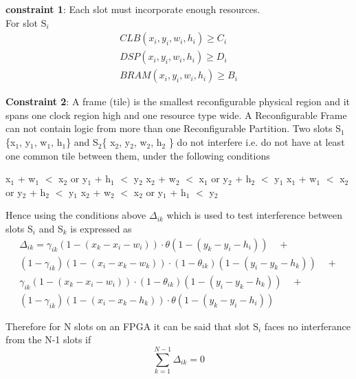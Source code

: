 \documentclass[11pt]{article}
\theoremstyle{definition}
\begin{document}
\textbf{constraint 1}: Each slot must incorporate enough resources. \\
For slot S$_i$
\begin{equation}
\begin{split}
CLB(x_{i}, y_{i}, w_{i}, h_{i}) \geq  C_{i}\\
DSP(x_{i}, y_{i}, w_{i}, h_{i}) \geq  D_{i} \\	
BRAM(x_{i}, y_{i}, w_{i}, h_{i}) \geq  B_{i}
\end{split}
\end{equation}

\textbf{Constraint 2}: A frame (tile) is the smallest reconfigurable physical region and it spans one clock region high and one resource type wide. A Reconfigurable Frame can not contain logic from more than one Reconfigurable Partition. Two slots S$_1$ \{x$_1$, y$_1$, w$_1$, h$_1$\} and S$_2$\{ x$_2$, y$_2$, w$_2$, h$_2$ \} do not interfere i.e. do not have at least one common tile between them, under the following conditions \\

\begin{algorithmic}
	\STATE x$_1$ + w$_1$ $<$ x$_2$ or y$_1$ + h$_1$ $<$ y$_2$
	\STATE x$_2$ + w$_2$ $<$ x$_1$ or y$_2$ + h$_2$ $<$ y$_1$
	\STATE x$_1$ + w$_1$ $<$ x$_2$ or y$_2$ + h$_2$ $<$ y$_1$
\ELSE
	\STATE x$_2$ + w$_2$ $<$ x$_2$ or y$_1$ + h$_1$ $<$ y$_2$
\ENDIF
\end{algorithmic}

Hence using the conditions above $\Delta_{ik}$ which is used to test interference between slots S$_i$ and S$_k$ is expressed as
\begin{equation}
\begin{split}
\Delta_{ik} = \gamma_{ik}(1-(x_k-x_i-w_i)) \cdot \theta(1-(y_k-y_i-h_i))  \quad + \\
			   	(1-\gamma_{ik})(1-(x_i-x_k-w_k)) \cdot (1-\theta_{ik})(1-(y_i-y_k-h_k))\quad  + \\
			   \gamma_{ik}(1-(x_k-x	_i-w_i)) \cdot (1-\theta_{ik})(1-(y_i-y_k-h_k))\quad + \\
			   (1-\gamma_{ik})(1-(x_i-x_k-h_k)) \cdot \theta(1-(y_k-y_i-h_i)) 
\end{split}
\end{equation}

Therefore for N slots on an FPGA it can be said that slot S$_i$ faces no interferance from the N-1 slots if
\begin{equation}
\sum_{k=1}^{N-1} \Delta_{ik} = 0
\end{equation}  
 
\end{document}
